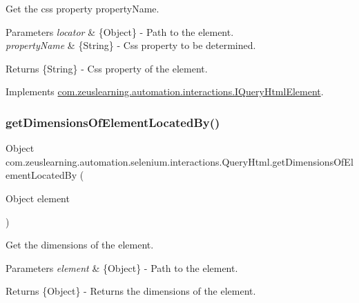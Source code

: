 Get the css property {\ttfamily property\+Name}.


\begin{DoxyParams}{Parameters}
{\em locator} & \{Object\} -\/ Path to the element. \\
\hline
{\em property\+Name} & \{String\} -\/ Css property to be determined.\\
\hline
\end{DoxyParams}
\begin{DoxyReturn}{Returns}
\{String\} -\/ Css property of the element. 
\end{DoxyReturn}


Implements \hyperlink{interfacecom_1_1zeuslearning_1_1automation_1_1interactions_1_1IQueryHtmlElement_a5ba6af3b91bc23e1d3bb3551a78cea5a}{com.\+zeuslearning.\+automation.\+interactions.\+I\+Query\+Html\+Element}.

\hypertarget{classcom_1_1zeuslearning_1_1automation_1_1selenium_1_1interactions_1_1QueryHtml_a57c813b972103a0a8160276012d202b2}{}\label{classcom_1_1zeuslearning_1_1automation_1_1selenium_1_1interactions_1_1QueryHtml_a57c813b972103a0a8160276012d202b2} 
\subsubsection{\texorpdfstring{get\+Dimensions\+Of\+Element\+Located\+By()}{getDimensionsOfElementLocatedBy()}}
{\footnotesize\ttfamily Object com.\+zeuslearning.\+automation.\+selenium.\+interactions.\+Query\+Html.\+get\+Dimensions\+Of\+Element\+Located\+By (\begin{DoxyParamCaption}\item[{Object}]{element }\end{DoxyParamCaption})\hspace{0.3cm}{\ttfamily [inline]}}

Get the dimensions of the element.


\begin{DoxyParams}{Parameters}
{\em element} & \{Object\} -\/ Path to the element. \\
\hline
\end{DoxyParams}
\begin{DoxyReturn}{Returns}
\{Object\} -\/ Returns the dimensions of the element. 
\end{DoxyReturn}


